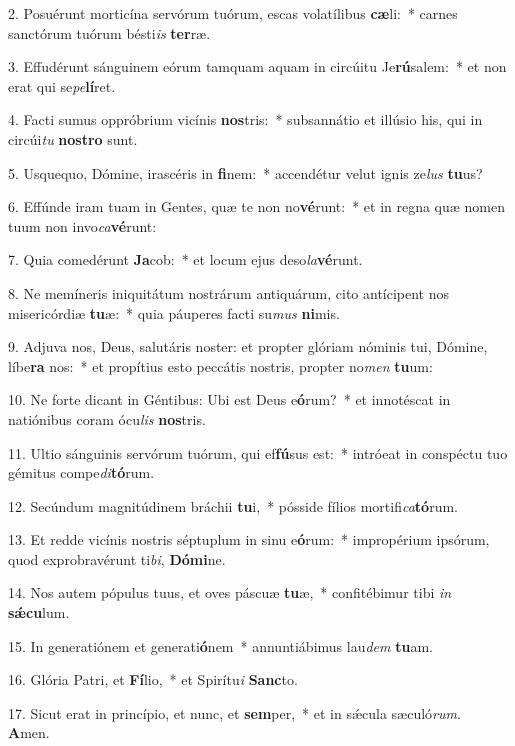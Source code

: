 2. Posuérunt morticína servórum tuórum, escas volatílibus \textbf{cæ}li:~*  carnes sanctórum tuórum bésti\textit{is} \textbf{ter}ræ.\

3. Effudérunt sánguinem eórum tamquam aquam in circúitu Je\textbf{rú}salem:~*  et non erat qui se\textit{pe}\textbf{lí}ret.\

4. Facti sumus oppróbrium vicínis \textbf{nos}tris:~*  subsannátio et illúsio his, qui in circúi\textit{tu} \textbf{nos}\textbf{tro} sunt.\

5. Usquequo, Dómine, irascéris in \textbf{fi}nem:~*  accendétur velut ignis ze\textit{lus} \textbf{tu}us?\

6. Effúnde iram tuam in Gentes, quæ te non no\textbf{vé}runt:~*  et in regna quæ nomen tuum non invo\textit{ca}\textbf{vé}runt:\

7. Quia comedérunt \textbf{Ja}cob:~*  et locum ejus deso\textit{la}\textbf{vé}runt.\

8. Ne memíneris iniquitátum nostrárum antiquárum, cito antícipent nos misericórdiæ \textbf{tu}æ:~*  quia páuperes facti su\textit{mus} \textbf{ni}mis.\

9. Adjuva nos, Deus, salutáris noster: et propter glóriam nóminis tui, Dómine, líbe\textbf{ra} nos:~*  et propítius esto peccátis nostris, propter no\textit{men} \textbf{tu}um:\

10. Ne forte dicant in Géntibus: Ubi est Deus e\textbf{ó}rum?~*  et innotéscat in natiónibus coram ócu\textit{lis} \textbf{nos}tris.\

11. Ultio sánguinis servórum tuórum, qui ef\textbf{fú}sus est:~*  intróeat in conspéctu tuo gémitus compe\textit{di}\textbf{tó}rum.\

12. Secúndum magnitúdinem bráchii \textbf{tu}i,~*  pósside fílios mortifi\textit{ca}\textbf{tó}rum.\

13. Et redde vicínis nostris séptuplum in sinu e\textbf{ó}rum:~*  impropérium ipsórum, quod exprobravérunt ti\textit{bi}, \textbf{Dó}\textbf{mi}ne.\

14. Nos autem pópulus tuus, et oves páscuæ \textbf{tu}æ,~*  confitébimur tibi \textit{in} \textbf{sǽ}\textbf{cu}lum.\

15. In generatiónem et generati\textbf{ó}nem~*  annuntiábimus lau\textit{dem} \textbf{tu}am.\

16. Glória Patri, et \textbf{Fí}lio,~*  et Spirítu\textit{i} \textbf{Sanc}to.\

17. Sicut erat in princípio, et nunc, et \textbf{sem}per,~*  et in sǽcula sæculó\textit{rum}. \textbf{A}men.\

